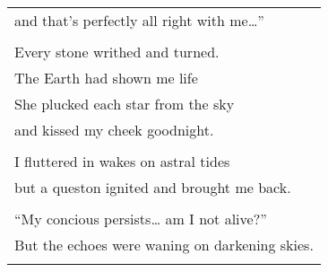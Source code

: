 \documentclass{article}
\begin{document}
\begin{center}
\begin{tabular}{l}
and that's perfectly all right with me\ldots{}'' \\
\\
Every stone writhed and turned. \\
The Earth had shown me life \\
She plucked each star from the sky \\
and kissed my cheek goodnight. \\
\\
I fluttered in wakes on astral tides \\
but a queston ignited and brought me back. \\
\\
``My concious persists\ldots{} am I not alive?'' \\
But the echoes were waning on darkening skies. \\
\\
\end{tabular}
\end{center}
\end{document}
